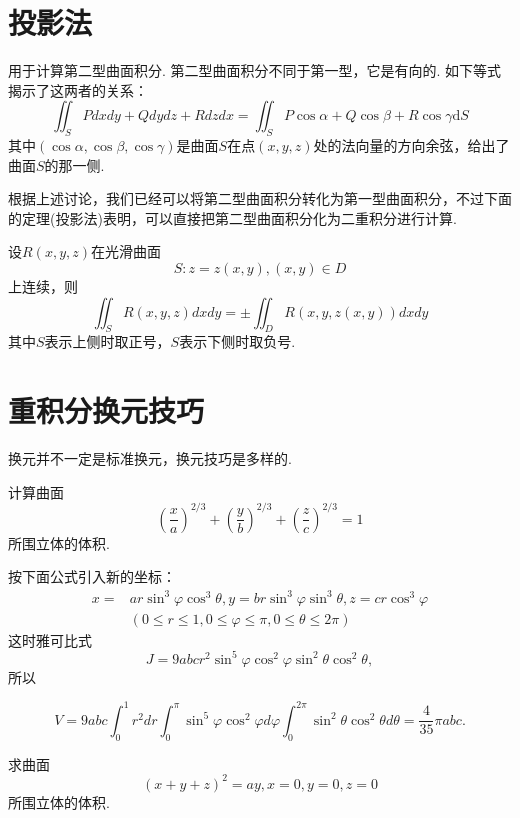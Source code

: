 \section{投影法}

用于计算第二型曲面积分. 第二型曲面积分不同于第一型，它是有向的. 如下等式揭示了这两者的关系：
\[
    \iint_S Pdxdy+Qdydz+Rdzdx=\iint_S P\cos\alpha+Q\cos\beta+R\cos\gamma\mathrm{d}S
\]
其中$(\cos\alpha,\cos\beta,\cos\gamma)$是曲面$S$在点$(x,y,z)$处的法向量的方向余弦，给出了曲面$S$的那一侧.

根据上述讨论，我们已经可以将第二型曲面积分转化为第一型曲面积分，不过下面的定理(投影法)表明，可以直接把第二型曲面积分化为二重积分进行计算.
\begin{theorem}[投影法]
    设$R(x,y,z)$在光滑曲面
    $$
    S:z=z(x,y), (x,y)\in D
    $$
    上连续，则
    $$
    \iint_S R(x,y,z)dxdy=\pm \iint_D R(x,y,z(x,y))dxdy
    $$
    其中$S$表示上侧时取正号，$S$表示下侧时取负号.
\end{theorem}

\section{重积分换元技巧}

换元并不一定是标准换元，换元技巧是多样的.

\begin{exercise}
    计算曲面
    \[
        \left(\frac{x}{a}\right)^{2/3}+\left(\frac{y}{b}\right)^{2/3}+\left(\frac{z}{c}\right)^{2/3}=1
    \]
    所围立体的体积.
\end{exercise}

\begin{solution}
    按下面公式引入新的坐标：
    $$
    \begin{aligned}
    x= & a r \sin ^3 \varphi \cos ^3 \theta, y=b r \sin ^3 \varphi \sin ^3 \theta, z=c r \cos ^3 \varphi \\
    & (0 \leqslant r \leqslant 1,0 \leqslant \varphi \leqslant \pi, 0 \leqslant \theta \leqslant 2 \pi)
    \end{aligned}
    $$
    这时雅可比式
    $$
    J=9 a b c r^2 \sin ^5 \varphi \cos ^2 \varphi \sin ^2 \theta \cos ^2 \theta,
    $$
    所以

    $$
    V=9 a b c \int_0^1 r^2 d r \int_0^\pi \sin ^5 \varphi \cos ^2 \varphi d \varphi \int_0^{2 \pi} \sin ^2 \theta \cos ^2 \theta d \theta=\frac{4}{35} \pi a b c .
    $$
\end{solution}

\begin{exercise}
    求曲面
    \[
        (x+y+z)^2=a y, x=0, y=0, z=0
    \]
    所围立体的体积.
\end{exercise}

